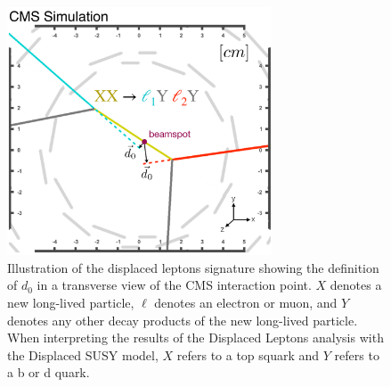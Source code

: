 \begin{figure}
\centering
\includegraphics[width=0.7\textwidth]{figures/overview/signalEventDisplay.pdf}
\caption{Illustration of the displaced leptons signature showing the definition of $d_0$ in a transverse view of the CMS interaction point. $X$ denotes a new long-lived particle, $\ell$ denotes an electron or muon, and $Y$ denotes any other decay products of the new long-lived particle. When interpreting the results of the Displaced Leptons analysis with the Displaced SUSY model, $X$ refers to a top squark and $Y$ refers to a b or d quark.} 
\label{displaced_leptons_cartoon}
\end{figure}